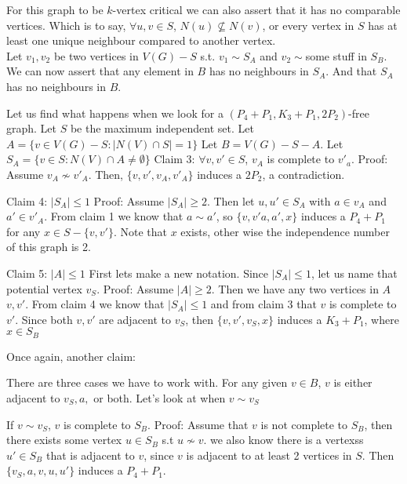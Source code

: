 \documentclass[12pt]{article}
\begin{document}
For this graph to be $k$-vertex critical we can also assert that it has no comparable vertices.
Which is to say, $\forall u, v \in S$, $N(u) \not \subseteq N(v)$, or every vertex in $S$ has at least one unique neighbour compared to another vertex.\\
Let $v_1, v_2$ be two vertices in $V(G) - S$ s.t. $v_1 \sim S_A$ and $v_2 \sim $some stuff in $S_B$.
We can now assert that any element in $B$ has no neighbours in $S_A$. And that $S_A$ has no neighbours in $B$.

Let us find what happens when we look for a $(P_4 + P_1, K_3 + P_1, 2P_2)$-free graph.
Let $S$ be the maximum independent set. Let $A = \{v \in V(G) - S : |N(V) \cap S| = 1\}$
Let $B = V(G) - S - A$.
Let $S_A = \{ v \in S : N(V) \cap A \not = \emptyset \}$
Claim 3: $\forall v, v' \in S$, $v_A$ is complete to $v'_a$.
Proof: Assume $v_A \not \sim v'_A$. Then, $\{ v, v', v_A, v'_A \}$ induces a $2P_2$, a contradiction.

Claim 4: $|S_A| \leq 1 $
Proof: Assume $|S_A| \geq 2$. Then let $u, u' \in S_A$ with $a \in v_A$ and $a' \in v'_A$. From claim 1 we know that $a \sim a'$, so $\{v, v' a, a', x\}$ induces a $P_4 + P_1$ for any $x \in S - \{v, v'\}$. Note that $x$ exists, other wise the independence number of this graph is 2.


Claim 5: $|A| \leq 1$
First lets make a new notation. Since $|S_A| \leq 1$, let us name that potential vertex $v_S$.
Proof: Assume $|A| \geq 2$. Then we have any two vertices in $A$ $v, v'$. From claim 4 we know that $|S_A| \leq 1$ and from claim 3 that $v$ is complete to $v'$. Since both $v, v'$ are adjacent to $v_S$, then  $\{v, v', v_S, x \}$ induces a $K_3 + P_1$, where $x \in S_B$

Once again, another claim:

There are three cases we have to work with.
For any given  $v \in B$, $v$ is either adjacent to $v_S, a,$ or both. Let's look at when $v \sim v_S$

If $v \sim v_S$, $v$ is complete to $S_B$. Proof: Assume that $v$ is not complete to $S_B$, then there exists some vertex $u \in S_B$ s.t $u \not \sim v$. we also know there is a vertexss $u' \in S_B$ that is adjacent to $v$, since $v$ is adjacent to at least 2 vertices in $S$. Then $\{v_S, a, v, u, u'\}$ induces a $P_4 + P_1$.
\end{document}
